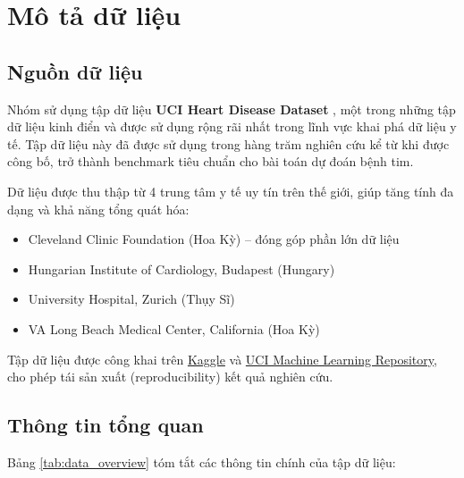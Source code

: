 \section{Mô tả dữ liệu}

\subsection{Nguồn dữ liệu}

Nhóm sử dụng tập dữ liệu \textbf{UCI Heart Disease Dataset} \cite{uci_heart, detrano1989international}, một trong những tập dữ liệu kinh điển và được sử dụng rộng rãi nhất trong lĩnh vực khai phá dữ liệu y tế. Tập dữ liệu này đã được sử dụng trong hàng trăm nghiên cứu kể từ khi được công bố, trở thành benchmark tiêu chuẩn cho bài toán dự đoán bệnh tim.

Dữ liệu được thu thập từ 4 trung tâm y tế uy tín trên thế giới, giúp tăng tính đa dạng và khả năng tổng quát hóa:
\begin{itemize}
    \item Cleveland Clinic Foundation (Hoa Kỳ) -- đóng góp phần lớn dữ liệu
    \item Hungarian Institute of Cardiology, Budapest (Hungary)
    \item University Hospital, Zurich (Thụy Sĩ)
    \item VA Long Beach Medical Center, California (Hoa Kỳ)
\end{itemize}

Tập dữ liệu được công khai trên \href{https://www.kaggle.com/datasets/johnsmith88/heart-disease-dataset}{Kaggle} và \href{https://archive.ics.uci.edu/dataset/45/heart+disease}{UCI Machine Learning Repository}, cho phép tái sản xuất (reproducibility) kết quả nghiên cứu.

\subsection{Thông tin tổng quan}

Bảng \ref{tab:data_overview} tóm tắt các thông tin chính của tập dữ liệu:

